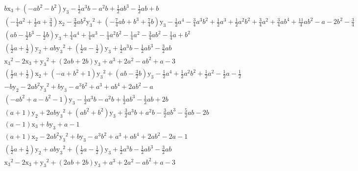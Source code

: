 \begin{multline*}
b \mathrm{x_3} + \left(-a b^{2} - b^{2}\right) \mathrm{y_3} - \frac{1}{2} a^{3} b - a^{2} b + \frac{1}{2} a b^{3} - \frac{1}{2} a b + b \\
\left(-\frac{1}{4} a^{2} + \frac{1}{2} a + \frac{3}{4}\right) \mathrm{x_2} - \frac{3}{2} a b^{2} \mathrm{y_3}^{2} + \left(-\frac{7}{4} a b + b^{3} + \frac{7}{4} b\right) \mathrm{y_3} - \frac{1}{2} a^{4} - \frac{3}{4} a^{3} b^{2} + \frac{1}{2} a^{3} + \frac{1}{2} a^{2} b^{2} + \frac{3}{4} a^{2} + \frac{3}{4} a b^{4} + \frac{11}{4} a b^{2} - a - 2 b^{2} - \frac{3}{4} \\
\left(a b - \frac{1}{2} b^{3} - \frac{1}{2} b\right) \mathrm{y_3} + \frac{1}{4} a^{4} + \frac{1}{4} a^{3} - \frac{1}{4} a^{2} b^{2} - \frac{1}{4} a^{2} - \frac{3}{4} a b^{2} - \frac{1}{4} a + b^{2} \\
\left(\frac{1}{2} a + \frac{1}{2}\right) \mathrm{y_2} + a b \mathrm{y_3}^{2} + \left(\frac{1}{2} a - \frac{1}{2}\right) \mathrm{y_3} + \frac{1}{2} a^{3} b - \frac{1}{2} a b^{3} - \frac{3}{2} a b \\
\mathrm{x_3}^{2} - 2 \mathrm{x_3} + \mathrm{y_3}^{2} + \left(2 a b + 2 b\right) \mathrm{y_3} + a^{3} + 2 a^{2} - a b^{2} + a - 3 \\
\left(\frac{1}{2} a + \frac{1}{2}\right) \mathrm{x_2} + \left(-a + b^{2} + 1\right) \mathrm{y_3}^{2} + \left(a b - \frac{3}{2} b\right) \mathrm{y_3} - \frac{1}{2} a^{4} + \frac{1}{2} a^{2} b^{2} + \frac{1}{2} a^{2} - \frac{1}{2} a - \frac{1}{2} \\
-b \mathrm{y_2} - 2 a b^{2} \mathrm{y_3}^{2} + b \mathrm{y_3} - a^{3} b^{2} + a^{3} + a b^{4} + 2 a b^{2} - a \\
\left(-a b^{2} + a - b^{2} - 1\right) \mathrm{y_3} - \frac{1}{2} a^{3} b - a^{2} b + \frac{1}{2} a b^{3} - \frac{1}{2} a b + 2 b \\
\left(a + 1\right) \mathrm{y_2} + 2 a b \mathrm{y_3}^{2} + \left(a b^{2} + b^{2}\right) \mathrm{y_3} + \frac{3}{2} a^{3} b + a^{2} b - \frac{3}{2} a b^{3} - \frac{5}{2} a b - 2 b \\
\left(a - 1\right) \mathrm{x_3} + b \mathrm{y_3} + a - 1 \\
\left(a + 1\right) \mathrm{x_2} - 2 a b^{2} \mathrm{y_3}^{2} + b \mathrm{y_3} - a^{3} b^{2} + a^{3} + a b^{4} + 2 a b^{2} - 2 a - 1 \\
\left(\frac{1}{2} a + \frac{1}{2}\right) \mathrm{y_2} + a b \mathrm{y_3}^{2} + \left(\frac{1}{2} a - \frac{1}{2}\right) \mathrm{y_3} + \frac{1}{2} a^{3} b - \frac{1}{2} a b^{3} - \frac{3}{2} a b \\
\mathrm{x_3}^{2} - 2 \mathrm{x_3} + \mathrm{y_3}^{2} + \left(2 a b + 2 b\right) \mathrm{y_3} + a^{3} + 2 a^{2} - a b^{2} + a - 3 \\

\end{multline*}
